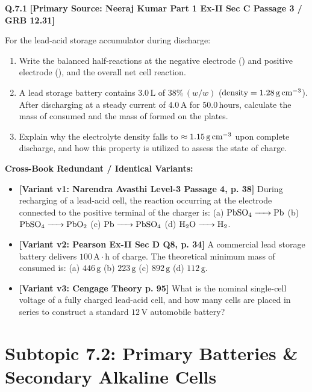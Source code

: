 \begin{problembox}
\textbf{Q.7.1} \hfill \textbf{[Primary Source: Neeraj Kumar Part 1 Ex-II Sec C Passage 3 / GRB  12.31]}
\label{q:qb-c7-01}

For the lead-acid storage accumulator during discharge:
\begin{enumerate}[label=(\alph*)]
    \item Write the balanced half-reactions at the negative electrode () and positive electrode (), and the overall net cell reaction.
    \item A lead storage battery contains $3.0\,\text{L}$ of $38\%\,(w/w)$  ($\text{density} = 1.28\,\text{g\,cm}^{-3}$). After discharging at a steady current of $4.0\,\text{A}$ for $50.0\,\text{hours}$, calculate the mass of  consumed and the mass of  formed on the plates.
    \item Explain why the electrolyte density falls to $\approx 1.15\,\text{g\,cm}^{-3}$ upon complete discharge, and how this property is utilized to assess the state of charge.
\end{enumerate}

\tcbline
\textbf{\color{accentamber}Cross-Book Redundant / Identical Variants:}
\begin{itemize}[leftmargin=*,itemsep=2pt]
    \item \textbf{[Variant v1: Narendra Avasthi Level-3 Passage 4, p. 38]} During recharging of a lead-acid cell, the reaction occurring at the electrode connected to the positive terminal of the charger is: (a) $\ce{PbSO4 -> Pb}$ (b) $\ce{PbSO4 -> PbO2}$ (c) $\ce{Pb -> PbSO4}$ (d) $\ce{H2O -> H2}$.
    \item \textbf{[Variant v2: Pearson Ex-II Sec D Q8, p. 34]} A commercial lead storage battery delivers $100\,\text{A}\cdot\text{h}$ of charge. The theoretical minimum mass of  consumed is: (a) $446\,\text{g}$ (b) $223\,\text{g}$ (c) $892\,\text{g}$ (d) $112\,\text{g}$.
    \item \textbf{[Variant v3: Cengage Theory p. 95]} What is the nominal single-cell voltage of a fully charged lead-acid cell, and how many cells are placed in series to construct a standard $12\,\text{V}$ automobile battery?
\end{itemize}
\end{problembox}

\section{Subtopic 7.2: Primary Batteries \& Secondary Alkaline Cells}

